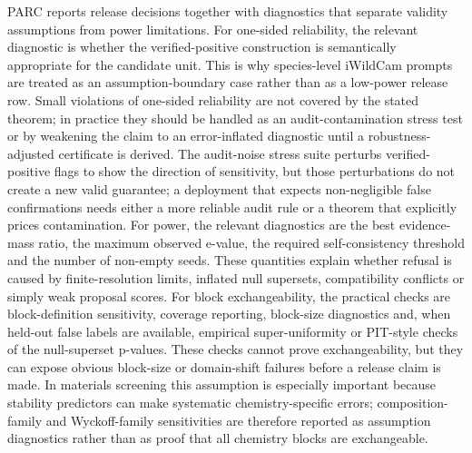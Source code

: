 \documentclass[10pt,twocolumn]{article}
\begin{document}
PARC reports release decisions together with diagnostics that separate validity assumptions from power limitations.
For one-sided reliability, the relevant diagnostic is whether the verified-positive construction is semantically appropriate for the candidate unit.
This is why species-level iWildCam prompts are treated as an assumption-boundary case rather than as a low-power release row.
Small violations of one-sided reliability are not covered by the stated theorem; in practice they should be handled as an audit-contamination stress test or by weakening the claim to an error-inflated diagnostic until a robustness-adjusted certificate is derived.
The audit-noise stress suite perturbs verified-positive flags to show the direction of sensitivity, but those perturbations do not create a new valid guarantee; a deployment that expects non-negligible false confirmations needs either a more reliable audit rule or a theorem that explicitly prices contamination.
For power, the relevant diagnostics are the best evidence-mass ratio, the maximum observed e-value, the required self-consistency threshold and the number of non-empty seeds.
These quantities explain whether refusal is caused by finite-resolution limits, inflated null supersets, compatibility conflicts or simply weak proposal scores.
For block exchangeability, the practical checks are block-definition sensitivity, coverage reporting, block-size diagnostics and, when held-out false labels are available, empirical super-uniformity or PIT-style checks of the null-superset p-values.
These checks cannot prove exchangeability, but they can expose obvious block-size or domain-shift failures before a release claim is made.
In materials screening this assumption is especially important because stability predictors can make systematic chemistry-specific errors; composition-family and Wyckoff-family sensitivities are therefore reported as assumption diagnostics rather than as proof that all chemistry blocks are exchangeable.
\end{document}
